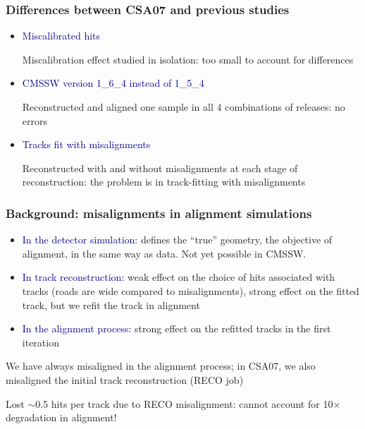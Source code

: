 \documentclass[compress]{beamer}
\begin{document}
\begin{frame}
\frametitle{Differences between CSA07 and previous studies}
\begin{itemize}\setlength{\itemsep}{0.5 cm}
\item \textcolor{darkblue}{Miscalibrated hits}

\vspace{0.25 cm}
Miscalibration effect studied in isolation: too small to account for differences

\item \textcolor{darkblue}{CMSSW version 1\_6\_4 instead of 1\_5\_4}

\vspace{0.25 cm}
Reconstructed and aligned one sample in all 4 combinations of releases: no errors

\item \textcolor{darkblue}{Tracks fit with misalignments}

\vspace{0.25 cm}
Reconstructed with and without misalignments at each stage of
reconstruction: the problem is in track-fitting with misalignments
\end{itemize}
\end{frame}

\begin{frame}
\frametitle{Background: misalignments in alignment simulations}

\begin{itemize}
\item \textcolor{darkblue}{In the detector simulation:} defines the ``true'' geometry, the objective of
alignment, in the same way as data.  Not yet possible in CMSSW.

\item \textcolor{darkblue}{In track reconstruction:} weak effect on the choice of hits
associated with tracks (roads are wide compared to misalignments),
strong effect on the fitted track, but we refit the track in alignment

\item \textcolor{darkblue}{In the alignment process:} strong effect on
the refitted tracks in the first iteration
\end{itemize}

\vspace{0.1 cm}
We have always misaligned in the alignment process; in CSA07, we
also misaligned the initial track reconstruction (RECO job)

\vspace{0.2 cm}
Lost $\sim$0.5 hits per track due to RECO misalignment: cannot account for 10$\times$ degradation in alignment!
\end{frame}
\end{document}
